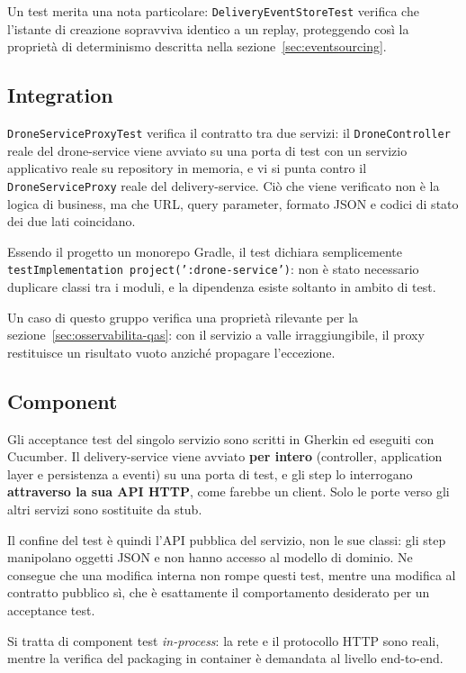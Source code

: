 \documentclass[12pt,a4paper]{article}
\begin{document}
Un test merita una nota particolare: \texttt{DeliveryEventStoreTest} verifica che l'istante di
creazione sopravviva identico a un replay, proteggendo cos\`i la propriet\`a di determinismo
descritta nella sezione~\ref{sec:eventsourcing}.

\subsection{Integration}

\texttt{DroneServiceProxyTest} verifica il contratto tra due servizi: il \texttt{DroneController}
reale del drone-service viene avviato su una porta di test con un servizio applicativo reale su
repository in memoria, e vi si punta contro il \texttt{DroneServiceProxy} reale del delivery-service.
Ci\`o che viene verificato non \`e la logica di business, ma che URL, query parameter, formato JSON e
codici di stato dei due lati coincidano.

Essendo il progetto un monorepo Gradle, il test dichiara semplicemente
\texttt{testImplementation project(':drone-service')}: non \`e stato necessario duplicare classi tra i
moduli, e la dipendenza esiste soltanto in ambito di test.

Un caso di questo gruppo verifica una propriet\`a rilevante per la sezione~\ref{sec:osservabilita-qas}:
con il servizio a valle irraggiungibile, il proxy restituisce un risultato vuoto anzich\'e propagare
l'eccezione.

\subsection{Component}

Gli acceptance test del singolo servizio sono scritti in Gherkin ed eseguiti con Cucumber. Il
delivery-service viene avviato \textbf{per intero} (controller, application layer e persistenza a
eventi) su una porta di test, e gli step lo interrogano \textbf{attraverso la sua API HTTP}, come
farebbe un client. Solo le porte verso gli altri servizi sono sostituite da stub.

Il confine del test \`e quindi l'API pubblica del servizio, non le sue classi: gli step manipolano
oggetti JSON e non hanno accesso al modello di dominio. Ne consegue che una modifica interna non
rompe questi test, mentre una modifica al contratto pubblico s\`i, che \`e esattamente il
comportamento desiderato per un acceptance test.

Si tratta di component test \emph{in-process}: la rete e il protocollo HTTP sono reali, mentre la
verifica del packaging in container \`e demandata al livello end-to-end.
\end{document}
